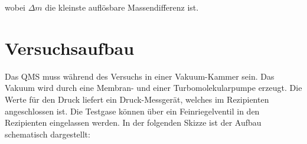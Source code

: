 wobei $\Delta m$ die kleinste  auflösbare Massendifferenz ist.

\section{Versuchsaufbau}
Das QMS muss während des Versuchs in einer Vakuum-Kammer sein. Das Vakuum wird durch eine Membran- und einer Turbomolekularpumpe erzeugt. Die Werte für den Druck liefert ein Druck-Messgerät, welches im Rezipienten angeschlossen ist. Die Testgase können über ein Feinriegelventil in den Rezipienten eingelassen werden. In der folgenden Skizze ist der Aufbau schematisch dargestellt:

